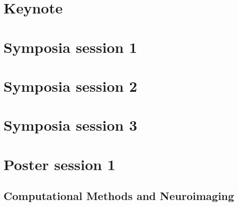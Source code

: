 \section{Keynote}
% 

\newpage

\section{Symposia session 1}

% 
% 
% 
% 
% 

\newpage

\section{Symposia session 2}
% 
% 
% 
% 
% 
% 

\newpage

\section{Symposia session 3}
% 
% 
% 
% 
% 
% 

\newpage

\section{Poster session 1 }

\subsection*{Computational Methods and Neuroimaging}

% 
% 
% 
% 
% 
% 
% 
% 
% 
% 
% 

